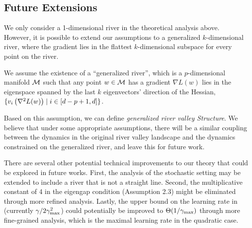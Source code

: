 \subsection{Future Extensions}
We only consider a 1-dimensional river in the theoretical analysis above. However, it is possible to extend our assumptions to a generalized $k$-dimensional river, where the gradient lies in the flattest $k$-dimensional subspace for every point on the river.

\begin{assumption}
\label{assum:gen-river}
    We assume the existence of a ``generalized river'', which is a $p$-dimensional manifold $\mathcal{M}$ such that any point $w \in \mathcal{M}$ has a gradient $\nabla L(w)$ lies in the eigenspace spanned by the last $k$ eigenvectors' direction of the Hessian, $\{ v_{i}\left(\nabla^2 L(w)\right) \mid i \in [d - p + 1, d] \}$. 
\end{assumption}

Based on this assumption, we can define \emph{generalized river valley Structure}. We believe that under some appropriate assumptions, there will be a similar coupling between the dynamics in the original river valley landscape and the dynamics constrained on the generalized river, and leave this for future work.

There are several other potential technical improvements to our theory that could be explored in future works. First, the analysis of the stochastic setting may be extended to include a river that is not a straight line. Second, the multiplicative constant of 4 in the eigengap condition (Assumption 2.3) might be eliminated through more refined analysis. Lastly, the upper bound on the learning rate in~ (currently $\gamma / 2\gamma_{\mathrm{max}}^2$) could potentially be improved to $\Theta(1/ \gamma_{\mathrm{max}})$ through more fine-grained analysis, which is the maximal learning rate in the quadratic case.

